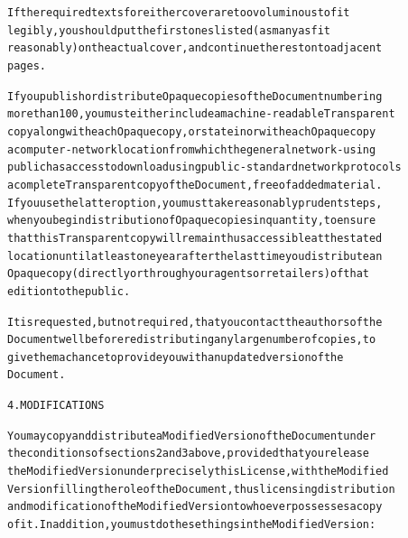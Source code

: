 \documentclass[DIV=12,%
               BCOR=0mm,%
               fontsize=10pt,%
               oneside,%
               paper=210mm:11in]{scrbook}
\begin{document}
\begin{alltt}
If the required texts for either cover are too voluminous to fit
legibly, you should put the first ones listed (as many as fit
reasonably) on the actual cover, and continue the rest onto adjacent
pages.

If you publish or distribute Opaque copies of the Document numbering
more than 100, you must either include a machine-readable Transparent
copy along with each Opaque copy, or state in or with each Opaque copy
a computer-network location from which the general network-using
public has access to download using public-standard network protocols
a complete Transparent copy of the Document, free of added material.
If you use the latter option, you must take reasonably prudent steps,
when you begin distribution of Opaque copies in quantity, to ensure
that this Transparent copy will remain thus accessible at the stated
location until at least one year after the last time you distribute an
Opaque copy (directly or through your agents or retailers) of that
edition to the public.

It is requested, but not required, that you contact the authors of the
Document well before redistributing any large number of copies, to
give them a chance to provide you with an updated version of the
Document.


4. MODIFICATIONS

You may copy and distribute a Modified Version of the Document under
the conditions of sections 2 and 3 above, provided that you release
the Modified Version under precisely this License, with the Modified
Version filling the role of the Document, thus licensing distribution
and modification of the Modified Version to whoever possesses a copy
of it.  In addition, you must do these things in the Modified Version:


\end{alltt}
\end{document}
